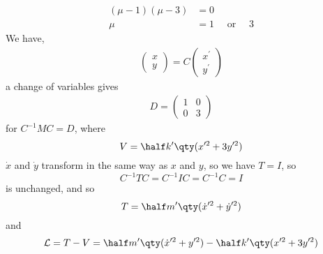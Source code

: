 \begin{example}
\begin{align*}
(\mu - 1)(\mu - 3) &= 0 \\
\mu &= 1 \quad \text{ or } \quad 3
\end{align*}
We have,
\begin{align*}
  \begin{pmatrix} x \\ y \end{pmatrix} =C \begin{pmatrix} x^{\prime}
    \\ y^{\prime}\end{pmatrix}
\end{align*}
a change of variables gives
\begin{align*}
  D = \begin{pmatrix} 1 & 0 \\ 0 & 3 \end{pmatrix}
\end{align*}
for $C^{-1}M C = D$, where
\[ V = \half k^{\prime} \qty( x^{\prime 2} + 3 y^{\prime 2} ) \]
$\dot{x}$ and $\dot{y}$ transform in the same way as $x$ and $y$, so
we have $T=I$, so
\[ C^{-1} T C = C^{-1} I C = C^{-1} C = I \] is unchanged, and so \[T
= \half m^{\prime} \qty( \dot{x}^{\prime 2} + \dot{y}^{\prime 2} ) \]
and 
\begin{equation*}
  {\cal L} = T - V = \half m^{\prime} \qty( \dot{x}^{\prime 2} + y^{\prime 2} ) - \half k^{\prime} \qty( x^{\prime 2} + 3 y^{\prime 2})
\end{equation*}


\end{example}

